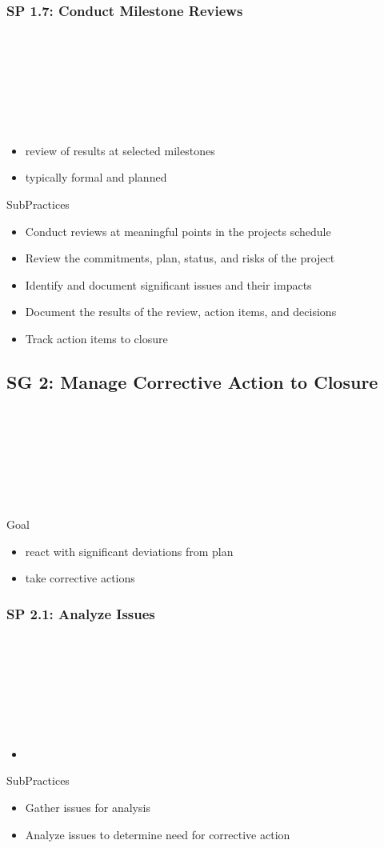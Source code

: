 \documentclass[accentcolor=tud1b]{tudbeamer}
\newcommand{\strong}[1]{\textaccentcolor{\textsf{\textbf{#1}}}}
\newenvironment*{tframe}[1][]{%
	\begin{frame}
	\ifnum\Level=2
		\frametitle{\insertsectionhead\\\strong{#1}}
	\fi\ifnum\Level=3
		\frametitle{\insertsectionhead\\\strong{\insertsubsectionhead} \textnormal{#1}}
	\fi\ifnum\Level=4
		\frametitle{\insertsubsectionhead\\\strong{\insertsubsubsectionhead} #1}
	\fi
}{%
	\end{frame}
}
\begin{document}
\subsubsection{SP 1.7: Conduct Milestone Reviews}
\begin{tframe}
	\begin{itemize}
		\item review of results at selected milestones
		\item typically formal and planned 
	\end{itemize}
	\begin{block}{SubPractices}
		\begin{itemize}
		  \item Conduct reviews at meaningful points in the projects schedule
		  \item Review the commitments, plan, status, and risks of the project
		  \item Identify and document significant issues and their impacts
		  \item Document the results of the review, action items, and decisions
		  \item Track action items to closure
		\end{itemize}
	\end{block}
\end{tframe}

\subsection{SG 2: Manage Corrective Action to Closure}
\begin{tframe}
	\begin{block}{Goal}
		\begin{itemize}
		  	\item react with significant deviations from plan
			\item take corrective actions
		\end{itemize}
	\end{block}
\end{tframe}

\subsubsection{SP 2.1: Analyze Issues}
\begin{tframe}
	\begin{itemize}
		\item 
	\end{itemize}
	\begin{block}{SubPractices}
		\begin{itemize}
		  \item Gather issues for analysis
		  \item Analyze issues to determine need for corrective action
		\end{itemize}
	\end{block}
\end{tframe}
\end{document}
